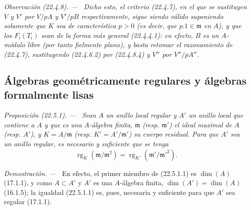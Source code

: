 \documentclass[10pt,oneside]{book}
\makeatletter
\newcommand{\setmanualcurrentlabel}[1]{\def\@currentlabel{#1}}
\newenvironment{proposition}[1][]{%
  \setmanualcurrentlabel{#1}\par\medskip\noindent\itshape Proposición (#1). ---\ }{\par}
\newenvironment{remark}[1][]{%
  \setmanualcurrentlabel{#1}\par\medskip\noindent\itshape Observación (#1). ---\ }{\par}
\newenvironment{proof}{%
  \par\medskip\noindent\textit{Demostración. ---\ }}{\par}
\makeatother
\begin{document}
\begin{remark}[22.4.8]
Dicho esto, \emph{el criterio \textup{(22.4.7)}, en el que se sustituyen $V$ y $V'$ por $V/pA$
y $V'/pB$ respectivamente, sigue siendo válido suponiendo solamente que $K$ sea
de característica $p>0$} (es decir, que $p.1\in\mathfrak m$ en
$A$), \emph{y que los $F_i(T_i)$ sean de la forma más general
\textup{(22.4.4.1)}}: en efecto, $B$ es un $A$-módulo libre (por tanto fielmente plano), y
basta retomar el razonamiento de (22.4.7), sustituyendo (22.4.6.2)
por (22.4.8.4) y $V''$ por $V''/pA''$.
\end{remark}

\subsection{Álgebras geométricamente regulares y álgebras formalmente lisas}
\label{subsection:0.22.5-es}

\begin{proposition}[22.5.1]
\label{0.22.5.1-es}
Sean $A$ un anillo local regular y $A'$ un anillo local que contiene a $A$ y que
es una $A$-álgebra finita, $\mathfrak m$ \textup{(resp. $\mathfrak m'$)} el ideal maximal
de $A$ \textup{(resp. $A'$)}, y $K=A/\mathfrak m$ \textup{(resp. $K'=A'/\mathfrak m'$)} su cuerpo
residual. Para que $A'$ sea un anillo regular, es necesario y suficiente que se
tenga
\begin{equation}
\label{0.22.5.1.1-es}
  \operatorname{rg}_K(\mathfrak m/\mathfrak m^2)
  =\operatorname{rg}_{K'}(\mathfrak m'/\mathfrak m'^2).
  \tag{22.5.1.1}
\end{equation}
\end{proposition}

\begin{proof}
En efecto, el primer miembro de (22.5.1.1) es $\dim(A)$ (17.1.1), y como
$A\subset A'$ y $A'$ es una $A$-álgebra finita,
$\dim(A')=\dim(A)$ (16.1.5); la igualdad (22.5.1.1) es, pues, necesaria y
suficiente para que $A'$ sea regular (17.1.1).
\end{proof}
\end{document}
